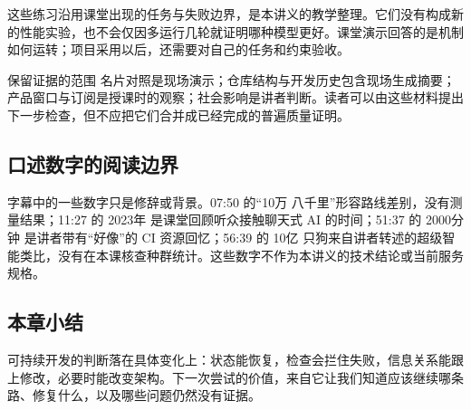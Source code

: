 \documentclass[a4paper]{article}
\begin{document}
这些练习沿用课堂出现的任务与失败边界，是本讲义的教学整理。它们没有构成新的性能实验，也不会仅因多运行几轮就证明哪种模型更好。课堂演示回答的是机制如何运转；项目采用以后，还需要对自己的任务和约束验收。

\begin{warningbox}{保留证据的范围}
名片对照是现场演示；仓库结构与开发历史包含现场生成摘要；产品窗口与订阅是授课时的观察；社会影响是讲者判断。读者可以由这些材料提出下一步检查，但不应把它们合并成已经完成的普遍质量证明。
\end{warningbox}

\subsection{口述数字的阅读边界}
字幕中的一些数字只是修辞或背景。07:50 的“10万 八千里”形容路线差别，没有测量结果；11:27 的 2023年 是课堂回顾听众接触聊天式 AI 的时间；51:37 的 2000分钟 是讲者带有“好像”的 CI 资源回忆；56:39 的 10亿 只狗来自讲者转述的超级智能类比，没有在本课核查种群统计。这些数字不作为本讲义的技术结论或当前服务规格。

\subsection{本章小结}
可持续开发的判断落在具体变化上：状态能恢复，检查会拦住失败，信息关系能跟上修改，必要时能改变架构。下一次尝试的价值，来自它让我们知道应该继续哪条路、修复什么，以及哪些问题仍然没有证据。

\end{document}
